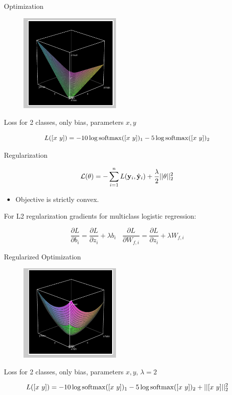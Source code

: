 \documentclass{beamer}
\begin{document}
\begin{frame}{Optimization}
  \begin{figure}
    \centering
    \includegraphics[width=5cm]{lrobj}
  \end{figure}
  
  \begin{center}
    Loss for 2 classes, only bias, parameters $x, y$
  \end{center}
  \[ L([x\ y]) = - 10 \log \softmax([x\ y])_1 -5\log \softmax([x\ y])_2 \] 

\end{frame}

\begin{frame}{Regularization}
 
  \[ \mathcal{L}(\theta) = - \sum_{i=1}^n L(\mathbf{y}_i, \hat{\mathbf{y}}_i) + \frac{\lambda}{2} ||\theta||^2_2\] 
  \begin{itemize}
  \item Objective is strictly convex.
  \end{itemize}

  For L2 regularization gradients for multiclass logistic regression:
  
  \[\frac{\partial L}{\partial b_{i}} = 
    \frac{\partial L}{\partial z_{i}} + \lambda b_{i} \ \ \ \ \frac{\partial L}{\partial W_{f, i}} = 
     \frac{\partial L}{\partial z_{i}} + \lambda  W_{f, i}\]

\end{frame}


\begin{frame}{Regularized Optimization}
  \begin{figure}
    \centering
    \includegraphics[width=5cm]{lrobjl2}
  \end{figure}
  
  \begin{center}
    Loss for 2 classes, only bias, parameters $x, y$, $\lambda=2$
  \end{center}
  \[ L([x\ y]) = - 10 \log \softmax([x\ y])_1 -5\log \softmax([x\ y])_2 + ||[x\ y]||_2^2\] 

\end{frame}
\end{document}
